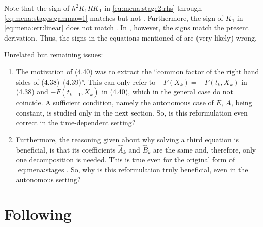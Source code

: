 Note that the sign of $h^2 K_1RK_1$ in
\eqref{eq:mena:stage2:rhs} through \eqref{eq:mena:stages:gamma=1}
matches \cite[Equation~(4.40)]{Mena2007} but not \cite[Equations (4.43) and (4.47)]{Mena2007}.
Furthermore, the sign of $K_1$ in \eqref{eq:mena:err:linear} does not match \cite[Equation~(4.47)]{Mena2007}.
In \cite[Algorithm 4.3.1]{Mena2007}, however, the signs match the present derivation.
Thus, the signs in the equations mentioned of \cite{Mena2007} are (very likely) wrong.

Unrelated but remaining issues:
\begin{enumerate}
  \item
    The motivation of (4.40) was to extract the \enquote{common factor of the right hand sides of (4.38)--(4.39)}.
    This can only refer to $-F(X_k) = -F(t_k, X_k)$ in (4.38) and $-F(t_{k+1}, X_k)$ in (4.40),
    which in the general case do not coincide.
    A sufficient condition, namely the autonomous case of $E$, $A$, \etc being constant,
    is studied only in the next section.
    So, is this reformulation even correct in the time-dependent setting?
  \item
    Furthermore, the reasoning given about why solving a third equation is beneficial,
    is that its coefficients $\hat{A}_k$ and $\hat{B}_k$ are the same and, therefore, only one decomposition is needed.
    This is true even for the original form of \eqref{eq:mena:stages}.
    So, why is this reformulation truly beneficial, even in the autonomous setting?
\end{enumerate}

\section{Following \cite{MPIMD11-06}}

